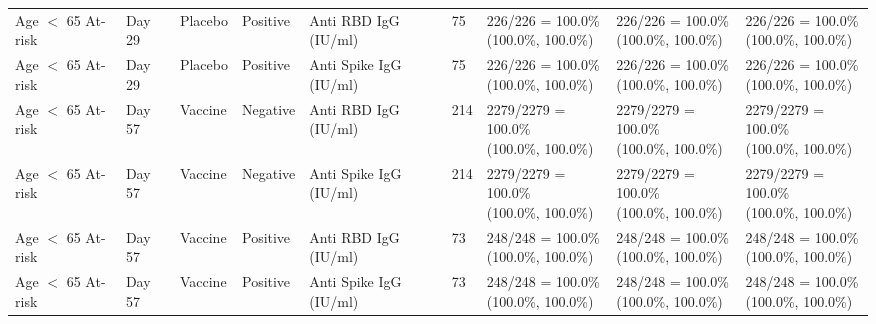 \documentclass[]{book}
\theoremstyle{definition}
\theoremstyle{definition}
\theoremstyle{definition}
\newcommand{\1}{\mathbbm{1}}
\begin{document}
\begin{landscape}
\begin{ThreePartTable}
\begin{longtable}[t]{>{\raggedright\arraybackslash}p{2.7cm}llllllll}
\hspace{1em}Age $<$ 65 At-risk & Day 29 & Placebo & Positive & Anti RBD IgG (IU/ml) & 75 & \makecell[l]{226/226 = 100.0\%\\(100.0\%, 100.0\%)} & \makecell[l]{226/226 = 100.0\%\\(100.0\%, 100.0\%)} & \makecell[l]{226/226 = 100.0\%\\(100.0\%, 100.0\%)}\\
\hspace{1em}Age $<$ 65 At-risk & Day 29 & Placebo & Positive & Anti Spike IgG (IU/ml) & 75 & \makecell[l]{226/226 = 100.0\%\\(100.0\%, 100.0\%)} & \makecell[l]{226/226 = 100.0\%\\(100.0\%, 100.0\%)} & \makecell[l]{226/226 = 100.0\%\\(100.0\%, 100.0\%)}\\
\hspace{1em}Age $<$ 65 At-risk & Day 57 & Vaccine & Negative & Anti RBD IgG (IU/ml) & 214 & \makecell[l]{2279/2279 = 100.0\%\\(100.0\%, 100.0\%)} & \makecell[l]{2279/2279 = 100.0\%\\(100.0\%, 100.0\%)} & \makecell[l]{2279/2279 = 100.0\%\\(100.0\%, 100.0\%)}\\
\hspace{1em}Age $<$ 65 At-risk & Day 57 & Vaccine & Negative & Anti Spike IgG (IU/ml) & 214 & \makecell[l]{2279/2279 = 100.0\%\\(100.0\%, 100.0\%)} & \makecell[l]{2279/2279 = 100.0\%\\(100.0\%, 100.0\%)} & \makecell[l]{2279/2279 = 100.0\%\\(100.0\%, 100.0\%)}\\
\hspace{1em}Age $<$ 65 At-risk & Day 57 & Vaccine & Positive & Anti RBD IgG (IU/ml) & 73 & \makecell[l]{248/248 = 100.0\%\\(100.0\%, 100.0\%)} & \makecell[l]{248/248 = 100.0\%\\(100.0\%, 100.0\%)} & \makecell[l]{248/248 = 100.0\%\\(100.0\%, 100.0\%)}\\
\hspace{1em}Age $<$ 65 At-risk & Day 57 & Vaccine & Positive & Anti Spike IgG (IU/ml) & 73 & \makecell[l]{248/248 = 100.0\%\\(100.0\%, 100.0\%)} & \makecell[l]{248/248 = 100.0\%\\(100.0\%, 100.0\%)} & \makecell[l]{248/248 = 100.0\%\\(100.0\%, 100.0\%)}\\

\end{longtable}
\end{ThreePartTable}
\end{landscape}
\end{document}
